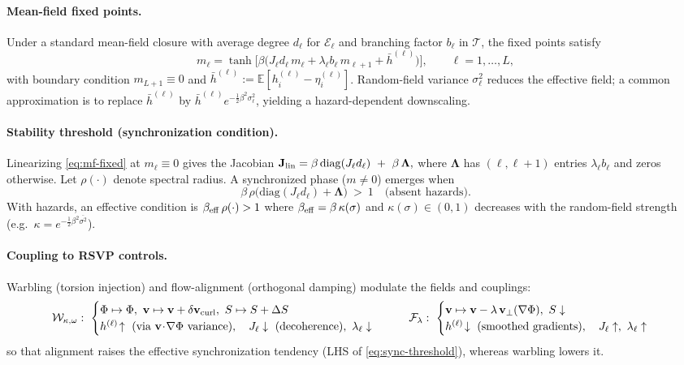 \documentclass[a4paper,11pt]{article}
\begin{document}
\paragraph{Mean-field fixed points.}
Under a standard mean-field closure with average degree $d_\ell$ for
$\mathcal{E}_\ell$ and branching factor $b_\ell$ in $\mathcal{T}$, the fixed
points satisfy
\begin{equation}
\label{eq:mf-fixed}
m_\ell
=
\tanh\!\Big[
  \beta \big(J_\ell d_\ell\, m_\ell + \lambda_\ell b_\ell\, m_{\ell+1}
  + \bar{h}^{(\ell)}\big)
\Big],
\qquad \ell=1,\dots,L,
\end{equation}
with boundary condition $m_{L+1}\equiv 0$ and
$\bar{h}^{(\ell)}:=\mathbb{E}[h_i^{(\ell)}-\eta_i^{(\ell)}]$.
Random-field variance $\sigma_\ell^2$ reduces the effective field; a common
approximation is to replace $\bar{h}^{(\ell)}$ by
$\bar{h}^{(\ell)} e^{-\frac{1}{2}\beta^2\sigma_\ell^2}$, yielding a
hazard-dependent downscaling.

\paragraph{Stability threshold (synchronization condition).}
Linearizing \eqref{eq:mf-fixed} at $m_\ell\equiv 0$ gives the Jacobian
\(
\mathbf{J}_{\rm lin}=\beta\,\mathrm{diag}(J_\ell d_\ell)\ +\
\beta\,\mathbf{\Lambda},
\)
where $\mathbf{\Lambda}$ has $(\ell,\ell{+}1)$ entries
$\lambda_\ell b_\ell$ and zeros otherwise. Let
$\rho(\cdot)$ denote spectral radius. A synchronized phase ($m\neq 0$) emerges
when
\begin{equation}
\label{eq:sync-threshold}
\beta\,\rho\!\big(\mathrm{diag}(J_\ell d_\ell)+\mathbf{\Lambda}\big)
\ >\ 1
\quad\text{(absent hazards).}
\end{equation}
With hazards, an effective condition is
\(
\beta_{\rm eff}\,\rho(\cdot)>1
\)
where $\beta_{\rm eff}=\beta\,\kappa(\sigma)$ and
$\kappa(\sigma)\in(0,1)$ decreases with the random-field strength
(e.g.\ $\kappa= e^{-\frac{1}{2}\beta^2 \overline{\sigma^2}}$).

\paragraph{Coupling to RSVP controls.}
Warbling (torsion injection) and flow-alignment (orthogonal damping) modulate
the fields and couplings:
\[
\mathcal{W}_{\kappa,\omega}:\ 
\begin{cases}
\Phi\mapsto\Phi,\ \mathbf v\mapsto \mathbf v+\delta\mathbf v_{\rm curl},\ S\mapsto S+\Delta S\\
h^{(\ell)}\!\uparrow\ \text{(via }\mathbf v\!\cdot\!\nabla\Phi\text{ variance)},\quad
J_\ell\downarrow\ (\text{decoherence}),\ \lambda_\ell\downarrow
\end{cases}
\qquad
\mathcal{F}_\lambda:\ 
\begin{cases}
\mathbf v\mapsto \mathbf v-\lambda\,\mathbf v_\perp(\nabla\Phi),\ S\downarrow\\
h^{(\ell)}\!\downarrow\ \text{(smoothed gradients)},\quad
J_\ell\uparrow,\ \lambda_\ell\uparrow
\end{cases}
\]
so that alignment raises the effective synchronization tendency (LHS of
\eqref{eq:sync-threshold}), whereas warbling lowers it.
\end{document}
